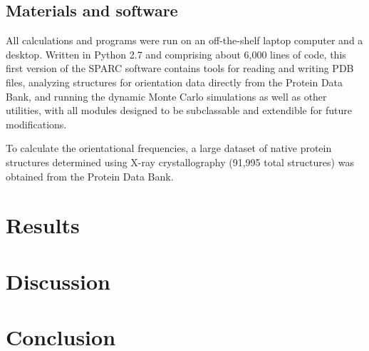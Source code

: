\documentclass[11pt,twocolumn]{article}
\begin{document}
\subsection{Materials and software}
\label{materials}
All calculations and programs were run on an off-the-shelf laptop computer and a desktop.
Written in Python 2.7 and comprising about 6,000 lines of code, this first version of the SPARC software contains tools for reading and writing PDB files, analyzing structures for orientation data directly from the Protein Data Bank, and running the dynamic Monte Carlo simulations as well as other utilities, with all modules designed to be subclassable and extendible for future modifications.

To calculate the orientational frequencies, a large dataset of native protein structures determined using X-ray crystallography (91,995 total structures) was obtained from the Protein Data Bank.

\section{Results}

\section{Discussion}

\section{Conclusion}


{\footnotesize }
\end{document}
